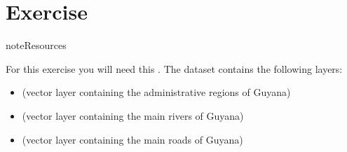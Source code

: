 \documentclass[letterpaper,10pt,english]{sphinxmanual}
\begin{document}
\section{Exercise}
\label{\detokenize{using_qgis:exercise}}
\begin{sphinxadmonition}{note}{Resources}

\begin{DUlineblock}{0em}
\item[] For this exercise you will need this . The dataset contains the following layers:
\end{DUlineblock}
\begin{itemize}
\item {} 
 (vector layer containing the administrative regions of Guyana)

\item {} 
 (vector layer containing the main rivers of Guyana)

\item {} 
 (vector layer containing the main roads of Guyana)

\end{itemize}
\end{sphinxadmonition}
\end{document}
